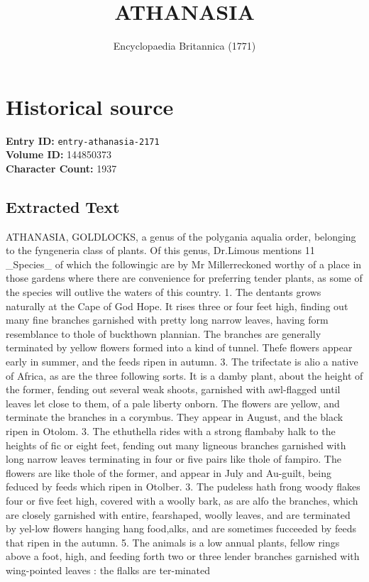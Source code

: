 \documentclass{article}
\title{ATHANASIA}
\date{Encyclopaedia Britannica (1771)}
\begin{document}
\maketitle

\section*{Historical source}
\textbf{Entry ID:} \texttt{entry-athanasia-2171} \\
\textbf{Volume ID:} 144850373 \\
\textbf{Character Count:} 1937

\subsection*{Extracted Text}
ATHANASIA, GOLDLOCKS, a genus of the polygania aqualia order, belonging to the fyngeneria class of plants. Of this genus, Dr.Limous mentions 11 \_Species\_ of which the followingic are by Mr Millerreckoned worthy of a place in those gardens where there are convenience for preferring tender plants, as some of the species will outlive the waters of this country. 1. The dentants grows naturally at the Cape of God Hope. It rises three or four feet high, finding out many fine branches garnished with pretty long narrow leaves, having form resemblance to thole of buckthown plannian. The branches are generally terminated by yellow flowers formed into a kind of tunnel. Thefe flowers appear early in summer, and the feeds ripen in autumn. 3. The trifectate is alio a native of Africa, as are the three following sorts. It is a damby plant, about the height of the former, fending out several weak shoots, garnished with awl-flagged until leaves let close to them, of a pale liberty onborn. The flowers are yellow, and terminate the branches in a corymbus. They appear in August, and the black ripen in Otolom. 3. The ethuthella rides with a strong flambaby halk to the heights of fic or eight feet, fending out many ligneous branches garnished with long narrow leaves terminating in four or five pairs like thole of fampiro. The flowers are like thole of the former, and appear in July and Au-guilt, being feduced by feeds which ripen in Otolber. 3. The pudeless hath frong woody flakes four or five feet high, covered with a woolly bark, as are alfo the branches, which are closely garnished with entire, fearshaped, woolly leaves, and are terminated by yel-low flowers hanging hang food,alks, and are sometimes fucceeded by feeds that ripen in the autumn. 5. The animals is a low annual plants, fellow rings above a foot, high, and feeding forth two or three lender branches garnished with wing-pointed leaves : the flalks are ter-minated
\end{document}
